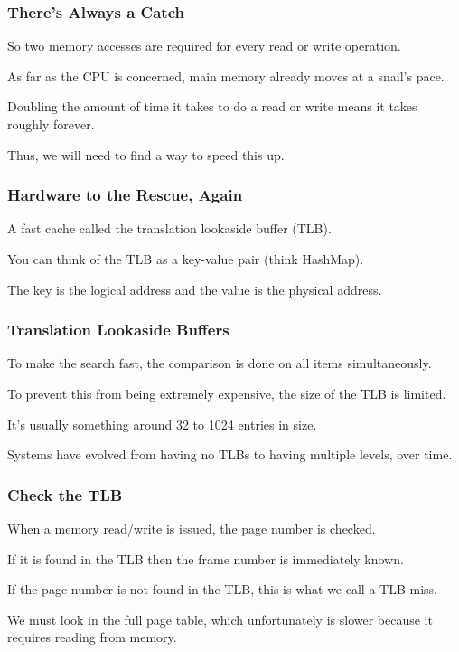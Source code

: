 \begin{frame}
\frametitle{There's Always a Catch}

So two memory accesses are required for every read or write operation. 

As far as the CPU is concerned, main memory already moves at a snail's pace. 

Doubling the amount of time it takes to do a read or write means it takes roughly forever. 

Thus, we will need to find a way to speed this up.

\end{frame}

\begin{frame}
\frametitle{Hardware to the Rescue, Again}

A fast cache called the \alert{translation lookaside buffer} (TLB). 

You can think of the TLB as a key-value pair (think HashMap). 

The key is the logical address and the value is the physical address. 

\end{frame}

\begin{frame}
\frametitle{Translation Lookaside Buffers}

To make the search fast, the comparison is done on all items simultaneously. 

To prevent this from being extremely expensive, the size of the TLB is limited.

It's usually something around 32 to 1024 entries in size. 

Systems have evolved from having no TLBs to having multiple levels, over time.

\end{frame}


\begin{frame}
\frametitle{Check the TLB}

When a memory read/write is issued, the page number is checked.

If it is found in the TLB then the frame number is immediately known. 

If the page number is not found in the TLB, this is what we call a \alert{TLB miss}.

We must look in the full page table, which unfortunately is slower because it requires reading from memory.

\end{frame}

